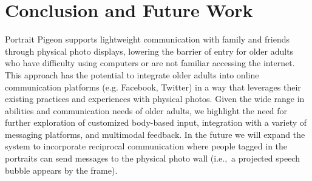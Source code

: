 \documentclass{chi-ext}
\begin{document}
\section{Conclusion and Future Work}
Portrait Pigeon supports lightweight communication with family and friends through physical photo displays, lowering the barrier of entry for older adults who have difficulty using computers or are not familiar accessing the internet. This approach has the potential to integrate older adults into online communication platforms (e.g. Facebook, Twitter) in a way that leverages their existing practices and experiences with physical photos.  Given the wide range in abilities and communication needs of older adults, we highlight the need for further exploration of customized body-based input, integration with a variety of messaging platforms, and multimodal feedback. In the future we will expand the system to incorporate reciprocal communication where people tagged in the portraits can send messages to the physical photo wall (i.e.,~a projected speech bubble appears by the frame).	



\balance


\end{document}
